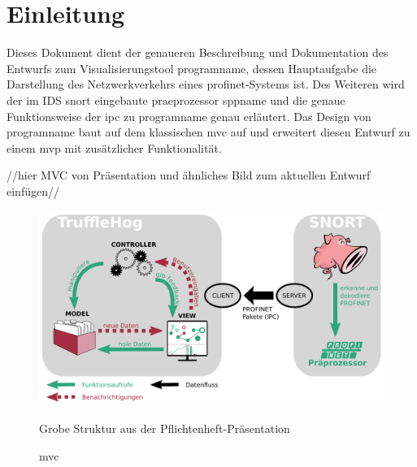 \chapter{Einleitung}
Dieses Dokument dient der genaueren Beschreibung und Dokumentation des Entwurfs zum Visualisierungstool \gls{programname}, dessen Hauptaufgabe die Darstellung des Netzwerkverkehrs eines \gls{profinet}-Systems ist. Des Weiteren wird der im IDS \gls{snort} eingebaute \gls{praeprozessor} \gls{sppname} und die genaue Funktionsweise der \gls{ipc} zu \gls{programname} genau erläutert.\newline
\newline
Das Design von \gls{programname} baut auf dem klassischen \gls{mvc} auf und erweitert diesen Entwurf zu einem \gls{mvp} mit zusätzlicher Funktionalität.

//hier MVC von Präsentation und ähnliches Bild zum aktuellen Entwurf einfügen//
 
\begin{figure}[H]
  \centering
  \includegraphics[width=\textwidth]{../diagramimages/praesentationsmodel.png}
  \caption[\gls{mvc}]{\gls{mvc}}
  \medskip
  Grobe Struktur aus der Pflichtenheft-Präsentation
\end{figure} 